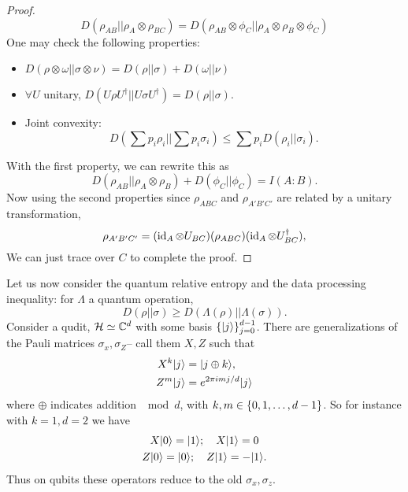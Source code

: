 \begin{enumerate}
\begin{proof}
\begin{equation}
            D(\rho_{AB}||\rho_A \otimes \rho_{BC})=D(\rho_{AB} \otimes \phi_{C} || \rho_A \otimes \rho_B \otimes \phi_C)
        \end{equation}
        One may check the following properties:
        \begin{itemize}
            \item $D(\rho\otimes \omega ||\sigma \otimes \nu) =D(\rho||\sigma) + D(\omega||\nu)$
            \item $\forall U$ unitary, $D(U\rho U^\dagger || U \sigma U^\dagger) =D(\rho||\sigma)$.
            \item Joint convexity:
            \begin{equation}
                D(\sum p_i \rho_i || \sum p_i \sigma_i) \leq \sum p_ i D(\rho_i ||\sigma_i).
            \end{equation}
        \end{itemize}
        With the first property, we can rewrite this as
        \begin{equation}
            D(\rho_{AB}||\rho_A \otimes \rho_B) +D(\phi_C||\phi_C) =I(A:B).
        \end{equation}
        Now using the second properties since $\rho_{ABC}$ and $\rho_{A'B'C'}$ are related by a unitary transformation,
        \begin{equation}
            \rho_{A'B'C'}=(\operatorname{id}_A \otimes U_{BC})(\rho_{ABC})(\operatorname{id}_A \otimes U_{BC}^\dagger),
        \end{equation}
        We can just trace over $C$ to complete the proof.
    \end{proof}
\end{enumerate}
Let us now consider the quantum relative entropy and the data processing inequality: for $\Lambda$ a quantum operation,
\begin{equation}
    D(\rho||\sigma) \geq D(\Lambda(\rho)||\Lambda(\sigma)).
\end{equation}
Consider a qudit, $\mathcal H\simeq \mathbb{C}^d$ with some basis $\{\lvert j\rangle\}_{j=0}^{d-1}$. There are generalizations of the Pauli matrices $\sigma_x,\sigma_Z$-- call them $X,Z$ such that
\begin{align}
    X^k \lvert j\rangle &= \lvert j \oplus k\rangle,\\
    Z^m\lvert j\rangle &= e^{2\pi i mj/d}\lvert j\rangle
\end{align}
where $\oplus$ indicates addition $\mod d$, with $k,m\in \{0,1,\ldots,d-1\}$. So for instance with $k=1,d=2$ we have
\begin{gather*}
    X\lvert0\rangle=\lvert1\rangle; \quad X\lvert1\rangle = 0\\
    Z\lvert0\rangle = \lvert0\rangle; \quad Z\lvert1\rangle = -\lvert1\rangle.
\end{gather*}
Thus on qubits these operators reduce to the old $\sigma_x,\sigma_z$.

